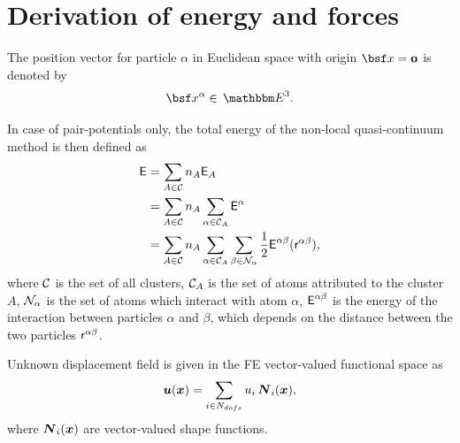 \documentclass[a4paper,10pt]{article}
\def\gz  #1{           \mbox{\boldmath $\mit #1$}}
\def\msf  #1{           \mbox{\!\!      $\sf #1$}}
\def\mcl  #1{               {\cal #1}}
\def\cc #1{\,{\mathbbm #1}}
\begin{document}
\section{Derivation of energy and forces}
The position vector for particle $\alpha$ in Euclidean space with origin $\bsf x = \gz 0$ is denoted by
\begin{align}
\bsf x^\alpha \in  \cc E^3.
\end{align}

In case of pair-potentials only, the total energy of the non-local quasi-continuum method is then defined as
\begin{align}
\begin{split}
\msf E &= \sum_{A \in \mcl C} n_A \msf E_A \\
           &= \sum_{A \in \mcl C} n_A \sum_{\alpha \in \mcl C_A} \msf E^\alpha \\
           &= \sum_{A \in \mcl C} n_A \sum_{\alpha \in \mcl C_A} \sum_{\beta \in \mcl N_\alpha} \frac{1}{2} \msf E^{\alpha \beta} (\msf r^{\alpha\beta}),
\end{split}
\end{align}
where $\mcl C$ is the set of all clusters, $\mcl C_A$ is the set of atoms attributed to the cluster $A$, $\mcl N_\alpha$ is the set of atoms which interact with atom $\alpha$,
$\msf E^{\alpha \beta}$ is the energy of the interaction between particles $\alpha$ and $\beta$, which depends on the distance between the two particles $\msf r^{\alpha\beta}$.

Unknown displacement field is given in the FE vector-valued functional space as
\begin{align}
\gz u (\gz x) = \sum_{i \in N_{dofs}} u_i \, \gz N_i (\gz x),
\end{align}
where $\gz N_i (\gz x)$ are vector-valued shape functions.
\end{document}
